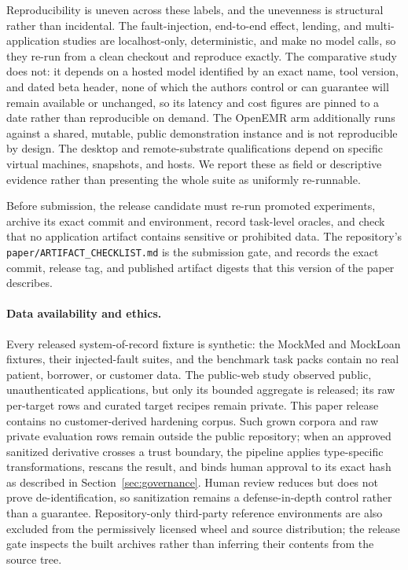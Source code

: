 Reproducibility is uneven across these labels, and the unevenness is
structural rather than incidental. The fault-injection, end-to-end effect,
lending, and multi-application studies are localhost-only, deterministic, and
make no model calls, so they re-run from a clean checkout and reproduce exactly.
The comparative study does not: it depends on a hosted model identified by an
exact name, tool version, and dated beta header, none of which the authors
control or can guarantee will remain available or unchanged, so its latency and
cost figures are pinned to a date rather than reproducible on demand. The
OpenEMR arm additionally runs against a shared, mutable, public demonstration
instance and is not reproducible by design. The desktop and remote-substrate
qualifications depend on specific virtual machines, snapshots, and hosts. We
report these as field or descriptive evidence rather than presenting the whole
suite as uniformly re-runnable.

Before submission, the release candidate must re-run promoted experiments,
archive its exact commit and environment, record task-level oracles, and check
that no application artifact contains sensitive or prohibited data. The
repository's \texttt{paper/ARTIFACT\_CHECKLIST.md} is the submission gate, and
records the exact commit, release tag, and published artifact digests that this
version of the paper describes.

\paragraph{Data availability and ethics.}
Every released system-of-record fixture is synthetic: the MockMed and MockLoan
fixtures, their injected-fault suites, and the benchmark task packs contain no
real patient, borrower, or customer data. The public-web study observed public,
unauthenticated applications, but only its bounded aggregate is released; its
raw per-target rows and curated target recipes remain private. This paper
release contains no customer-derived hardening corpus. Such grown corpora and
raw private evaluation rows remain outside the public repository; when an
approved sanitized derivative crosses a trust boundary, the pipeline applies
type-specific transformations, rescans the result, and binds human approval to
its exact hash as described in
Section~\ref{sec:governance}. Human review reduces but does not prove
de-identification, so sanitization remains a defense-in-depth control rather
than a guarantee. Repository-only third-party reference environments are also
excluded from the permissively licensed wheel and source distribution; the
release gate inspects the built archives rather than inferring their contents
from the source tree.
